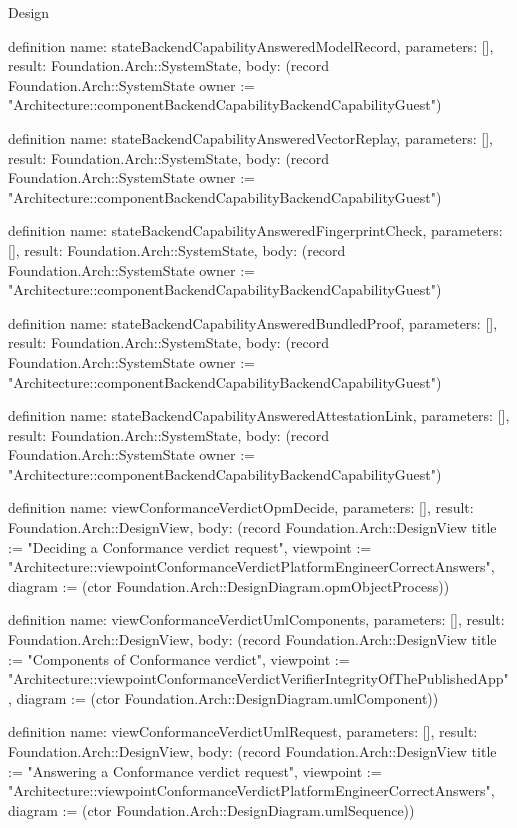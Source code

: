 \begin{lexlean}{Design}
\begin{semanticmodule}
definition{
  name: stateBackendCapabilityAnsweredModelRecord,
  parameters: [],
  result: Foundation.Arch::SystemState,
  body: (record Foundation.Arch::SystemState {owner := "Architecture::componentBackendCapabilityBackendCapabilityGuest"})
}

definition{
  name: stateBackendCapabilityAnsweredVectorReplay,
  parameters: [],
  result: Foundation.Arch::SystemState,
  body: (record Foundation.Arch::SystemState {owner := "Architecture::componentBackendCapabilityBackendCapabilityGuest"})
}

definition{
  name: stateBackendCapabilityAnsweredFingerprintCheck,
  parameters: [],
  result: Foundation.Arch::SystemState,
  body: (record Foundation.Arch::SystemState {owner := "Architecture::componentBackendCapabilityBackendCapabilityGuest"})
}

definition{
  name: stateBackendCapabilityAnsweredBundledProof,
  parameters: [],
  result: Foundation.Arch::SystemState,
  body: (record Foundation.Arch::SystemState {owner := "Architecture::componentBackendCapabilityBackendCapabilityGuest"})
}

definition{
  name: stateBackendCapabilityAnsweredAttestationLink,
  parameters: [],
  result: Foundation.Arch::SystemState,
  body: (record Foundation.Arch::SystemState {owner := "Architecture::componentBackendCapabilityBackendCapabilityGuest"})
}

definition{
  name: viewConformanceVerdictOpmDecide,
  parameters: [],
  result: Foundation.Arch::DesignView,
  body: (record Foundation.Arch::DesignView {title := "Deciding a Conformance verdict request", viewpoint := "Architecture::viewpointConformanceVerdictPlatformEngineerCorrectAnswers", diagram := (ctor Foundation.Arch::DesignDiagram.opmObjectProcess)})
}

definition{
  name: viewConformanceVerdictUmlComponents,
  parameters: [],
  result: Foundation.Arch::DesignView,
  body: (record Foundation.Arch::DesignView {title := "Components of Conformance verdict", viewpoint := "Architecture::viewpointConformanceVerdictVerifierIntegrityOfThePublishedApp", diagram := (ctor Foundation.Arch::DesignDiagram.umlComponent)})
}

definition{
  name: viewConformanceVerdictUmlRequest,
  parameters: [],
  result: Foundation.Arch::DesignView,
  body: (record Foundation.Arch::DesignView {title := "Answering a Conformance verdict request", viewpoint := "Architecture::viewpointConformanceVerdictPlatformEngineerCorrectAnswers", diagram := (ctor Foundation.Arch::DesignDiagram.umlSequence)})
}


\end{semanticmodule}
\end{lexlean}
